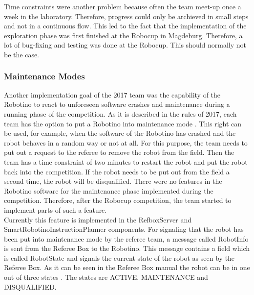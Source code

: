 Time constraints were another problem because often the team meet-up once a week in the laboratory. Therefore, progress could only be archieved in small steps and not in a continuous flow. This led to the fact that the implementation of the exploration phase was first finished at the Robocup in Magdeburg. Therefore, a lot of bug-fixing and testing was done at the Robocup. This should normally not be the case.  


\subsubsection{Maintenance Modes}

Another implementation goal of the 2017 team was the capability of the Robotino to react to unforeseen software crashes and maintenance during a running phase of the competition. As it is described in the rules of 2017, each team has the option to put a Robotino into maintenance mode \cite{RC17}. This right can be used, for example, when the software of the Robotino has crashed and the robot behaves in a random way or not at all. For this purpose, the team needs to put out a request to the referee to remove the robot from the field. Then the team has a time constraint of two minutes to restart the robot and put the robot back into the competition. If the robot needs to be put out from the field a second time, the robot will be disqualified. There were no features in the Robotino software for the maintenance phase implemented during the competition. Therefore, after the Robocup competition, the team started to implement parts of such a feature. \\

Currently this feature is implemented in the RefboxServer and SmartRobotinoInstructionPlanner components. For signaling that the robot has been put into maintenance mode by the referee team, a message called RobotInfo is sent from the Referee Box to the Robotino. This message contains a field which is called RobotState and signals the current state of the robot as seen by the Referee Box. As it can be seen in the Referee Box manual the robot can be in one out of three states \cite{RM15}. The states are ACTIVE, MAINTENANCE and DISQUALIFIED. \\

